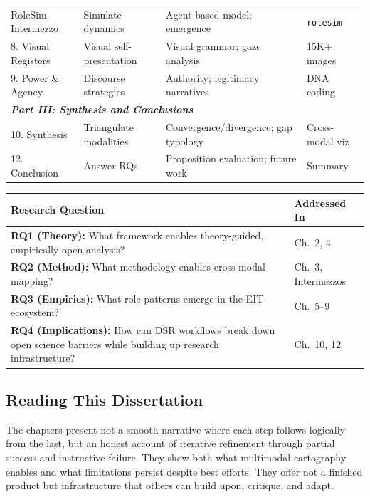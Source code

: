 \documentclass[../main.tex]{subfiles}
\begin{document}
\begin{wideblock}
\begin{tabularx}{0.95\textwidth}{@{}lXXX@{}}
RoleSim Intermezzo & Simulate dynamics & Agent-based model; emergence & \texttt{rolesim} \\[0.4em]
8. Visual Registers & Visual self-presentation & Visual grammar; gaze analysis & 15K+ images \\[0.4em]
9. Power \& Agency & Discourse strategies & Authority; legitimacy narratives & DNA coding \\
\midrule
\multicolumn{4}{l}{\textit{\textbf{Part III: Synthesis and Conclusions}}} \\[0.3em]
10. Synthesis & Triangulate modalities & Convergence/divergence; gap typology & Cross-modal viz \\[0.4em]
12. Conclusion & Answer RQs & Proposition evaluation; future work & Summary \\
\bottomrule
\end{tabularx}
\label{tab:intro:chapter-synthesis}
\end{wideblock}

\begin{center}
\small
\begin{tabular}{@{}p{5.5cm}p{4.5cm}@{}}
\toprule
\textbf{Research Question} & \textbf{Addressed In} \\
\midrule
\textbf{RQ1 (Theory):} What framework enables theory-guided, empirically open analysis? & Ch.~2, 4 \\[0.6em]
\textbf{RQ2 (Method):} What methodology enables cross-modal mapping? & Ch.~3, Intermezzos \\[0.6em]
\textbf{RQ3 (Empirics):} What role patterns emerge in the EIT ecosystem? & Ch.~5--9 \\[0.6em]
\textbf{RQ4 (Implications):} How can DSR workflows break down open science barriers while building up research infrastructure? & Ch.~10, 12 \\
\bottomrule
\end{tabular}
\label{tab:intro:rq-mapping}
\end{center}

\subsection{Reading This Dissertation}

The chapters present not a smooth narrative where each step follows logically from the last, but an honest account of iterative refinement through partial success and instructive failure. They show both what multimodal cartography enables and what limitations persist despite best efforts. They offer not a finished product but infrastructure that others can build upon, critique, and adapt.
\end{document}
